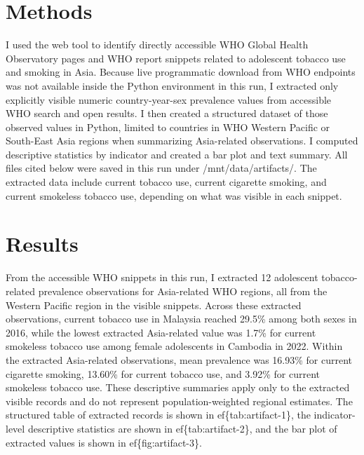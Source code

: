 \documentclass[11pt]{article}
\begin{document}
\section{Methods}
I used the web tool to identify directly accessible WHO Global Health Observatory pages and WHO report snippets related to adolescent tobacco use and smoking in Asia. Because live programmatic download from WHO endpoints was not available inside the Python environment in this run, I extracted only explicitly visible numeric country-year-sex prevalence values from accessible WHO search and open results. I then created a structured dataset of those observed values in Python, limited to countries in WHO Western Pacific or South-East Asia regions when summarizing Asia-related observations. I computed descriptive statistics by indicator and created a bar plot and text summary. All files cited below were saved in this run under /mnt/data/artifacts/. The extracted data include current tobacco use, current cigarette smoking, and current smokeless tobacco use, depending on what was visible in each snippet.

\section{Results}
From the accessible WHO snippets in this run, I extracted 12 adolescent tobacco-related prevalence observations for Asia-related WHO regions, all from the Western Pacific region in the visible snippets. Across these extracted observations, current tobacco use in Malaysia reached 29.5\% among both sexes in 2016, while the lowest extracted Asia-related value was 1.7\% for current smokeless tobacco use among female adolescents in Cambodia in 2022. Within the extracted Asia-related observations, mean prevalence was 16.93\% for current cigarette smoking, 13.60\% for current tobacco use, and 3.92\% for current smokeless tobacco use. These descriptive summaries apply only to the extracted visible records and do not represent population-weighted regional estimates. The structured table of extracted records is shown in 
ef\{tab:artifact-1\}, the indicator-level descriptive statistics are shown in 
ef\{tab:artifact-2\}, and the bar plot of extracted values is shown in 
ef\{fig:artifact-3\}.
\end{document}
